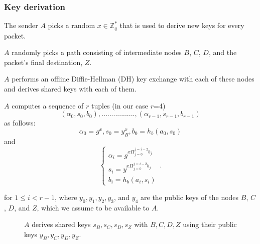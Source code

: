 \subsubsection{Key derivation}
\label{sec:sphinx:keyderivation}

The sender $A$ picks a random $x\in \mathbb{Z}^*_q$ that is used to derive new keys for every packet.

$A$ randomly picks a path consisting of intermediate nodes $B$, $C$, $D$, and the packet's final destination, $Z$.

$A$ performs an offline Diffie-Hellman (DH) key exchange with each of these nodes and derives shared keys with each of them.

$A$ computes a sequence of $r$ tuples (in our case $r$=4)  $$(\alpha_0,s_0,b_0),.................,(\alpha_{r-1},s_{r-1},b_{r-1})$$ as follows:
$$\alpha_0=g^x,s_0=y^x_B,b_0=h_b(a_0,s_0)$$
and
\begin{equation}
    \begin{cases}
        \alpha_i=g^{x\Pi_{j=0}^{j=i-2}b_j} \\
        s_i=y^{x\Pi_{j=0}^{j=i-2}b_j}      \\
        b_i=h_b(a_i,s_i)
    \end{cases}\,.
    \label{eq:1}
\end{equation}

for $1\le i < r-1$, where $y_0,y_1, y_2, y_3$, and $y_4$ are the public keys of the nodes $B$, $C$, $D$, and $Z$, which we assume to be available to $A$.

\begin{figure}[H]
    \caption{$A$ derives shared keys $s_B,s_C,s_D,s_Z$ with $B,C,D,Z$ using their public keys $y_B,y_C,y_D,y_Z$.}
    \label{fig:sphinx:keyderivation}
\end{figure}

